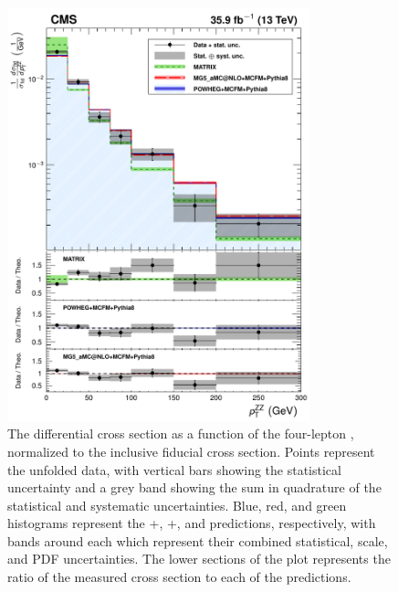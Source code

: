 \begin{figure}[htbp]
  \begin{center}
    \includegraphics[width=0.78\textwidth]{results/unfold_pt.pdf}
    \caption[Normalized differential {\ZZ} cross section as a function of four-lepton system {\pt}]{
        The {\ZZ} differential cross section as a function of the four-lepton {\pt}, normalized to the inclusive fiducial cross section.
        Points represent the unfolded data, with vertical bars showing the statistical uncertainty and a grey band showing the sum in quadrature of the statistical and systematic uncertainties.
        Blue, red, and green histograms represent the {\POWHEG}+{\MCFM}, {\MGAMC}+{\MCFM}, and {\MATRIX} predictions, respectively, with bands around each which represent their combined statistical, scale, and PDF uncertainties.
        The lower sections of the plot represents the ratio of the measured cross section to each of the predictions.
      }\label{fig:unfold_pt}
  \end{center}
\end{figure}

